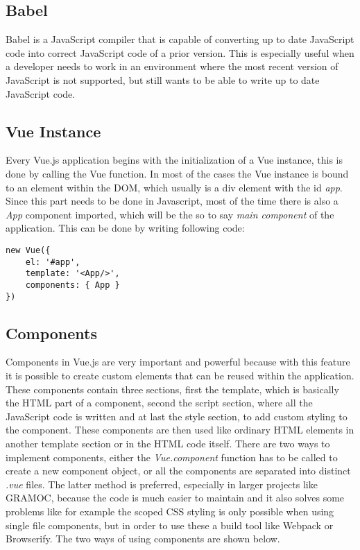 \subsection{Babel}
Babel is a JavaScript compiler that is capable of converting up to date JavaScript code into correct JavaScript code of a prior version. This is especially useful when a developer needs to work in an environment where the most recent version of JavaScript is not supported, but still wants to be able to write up to date JavaScript code.

\subsection{Vue Instance}
Every Vue.js application begins with the initialization of a Vue instance, this is done by calling the {Vue} function. In most of the cases the Vue instance is bound to an element within the DOM, which usually is a div element with the id \textit{app}. Since this part needs to be done in Javascript, most of the time there is also a \textit{App} component imported, which will be the so to say \textit{main component} of the application. This can be done by writing following code:

\begin{minipage}{\linewidth}
\begin{lstlisting}[caption={Creating a Vue instance}, label=lst:vue-instance, captionpos=b, style=htmlcssjs]
new Vue({
    el: '#app',
    template: '<App/>',
    components: { App }
})
\end{lstlisting}
\end{minipage}

\subsection{Components}
Components in Vue.js are very important and powerful because with this feature it is possible to create custom elements that can be reused within the application. These components contain three sections, first the template, which is basically the HTML part of a component, second the script section, where all the JavaScript code is written and at last the style section, to add custom styling to the component. These components are then used like ordinary HTML elements in another template section or in the HTML code itself. There are two ways to implement components, either the \textit{Vue.component} function has to be called to create a new component object, or all the components are separated into distinct \textit{.vue} files. The latter method is preferred, especially in larger projects like GRAMOC, because the code is much easier to maintain and it also solves some problems like for example the scoped CSS styling is only possible when using single file components, but in order to use these a build tool like Webpack or Browserify. The two ways of using components are shown below.

